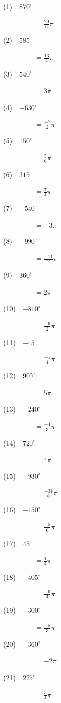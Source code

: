 \documentclass[a4j,twocolumn,10pt,fleqn]{jarticle}
\begin{document}
(1)~~$870^\circ$

~~~~~~~~~$=\frac{29}{6}\pi$

(2)~~$585^\circ$

~~~~~~~~~$=\frac{13}{4}\pi$

(3)~~$540^\circ$

~~~~~~~~~$=3\pi$

(4)~~$-630^\circ$

~~~~~~~~~$=\frac{-7}{2}\pi$

(5)~~$150^\circ$

~~~~~~~~~$=\frac{5}{6}\pi$

(6)~~$315^\circ$

~~~~~~~~~$=\frac{7}{4}\pi$

(7)~~$-540^\circ$

~~~~~~~~~$=-3\pi$

(8)~~$-990^\circ$

~~~~~~~~~$=\frac{-11}{2}\pi$

(9)~~$360^\circ$

~~~~~~~~~$=2\pi$

(10)~~$-810^\circ$

~~~~~~~~~$=\frac{-9}{2}\pi$

(11)~~$-45^\circ$

~~~~~~~~~$=\frac{-1}{4}\pi$

(12)~~$900^\circ$

~~~~~~~~~$=5\pi$

(13)~~$-240^\circ$

~~~~~~~~~$=\frac{-4}{3}\pi$

(14)~~$720^\circ$

~~~~~~~~~$=4\pi$

(15)~~$-930^\circ$

~~~~~~~~~$=\frac{-31}{6}\pi$

(16)~~$-150^\circ$

~~~~~~~~~$=\frac{-5}{6}\pi$

(17)~~$45^\circ$

~~~~~~~~~$=\frac{1}{4}\pi$

(18)~~$-405^\circ$

~~~~~~~~~$=\frac{-9}{4}\pi$

(19)~~$-300^\circ$

~~~~~~~~~$=\frac{-5}{3}\pi$

(20)~~$-360^\circ$

~~~~~~~~~$=-2\pi$

(21)~~$225^\circ$

~~~~~~~~~$=\frac{5}{4}\pi$
\end{document}
